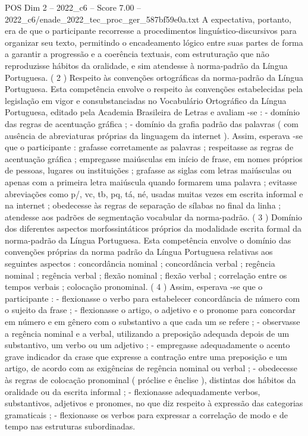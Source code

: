 \begin{textsample}{POS Dim 2 – 2022\_c6 – Score 7.00 – 2022\_c6/enade\_2022\_tec\_proc\_ger\_587bf59e0a.txt}
A expectativa, portanto, era de que o participante recorresse a procedimentos linguístico-discursivos para organizar seu texto, permitindo o encadeamento lógico entre suas partes de forma a garantir a progressão e a coerência textuais, com estruturação que não reproduzisse hábitos da oralidade, e sim atendesse à norma-padrão da Língua Portuguesa. ( 2 ) Respeito às convenções ortográficas da norma-padrão da Língua Portuguesa.
Esta competência envolve o respeito às convenções estabelecidas pela legislação em vigor e consubstanciadas no Vocabulário Ortográfico da Língua Portuguesa, editado pela Academia Brasileira de Letras e avaliam -se : - domínio das regras de acentuação gráfica ; - domínio da grafia padrão das palavras ( com ausência de abreviaturas próprias da linguagem da internet ).
Assim, esperava -se que o participante : grafasse corretamente as palavras ; respeitasse as regras de acentuação gráfica ; empregasse maiúsculas em início de frase, em nomes próprios de pessoas, lugares ou instituições ; grafasse as siglas com letras maiúsculas ou apenas com a primeira letra maiúscula quando formarem uma palavra ; evitasse abreviações como p/, vc, tb, pq, tá, né, usadas muitas vezes em escrita informal e na internet ; obedecesse às regras de separação de sílabas no final da linha ; atendesse aos padrões de segmentação vocabular da norma-padrão. ( 3 ) Domínio dos diferentes aspectos morfossintáticos próprios da modalidade escrita formal da norma-padrão da Língua Portuguesa.
Esta competência envolve o domínio das convenções próprias da norma padrão da Língua Portuguesa relativas aos seguintes aspectos : concordância nominal ; concordância verbal ; regência nominal ; regência verbal ; flexão nominal ; flexão verbal ; correlação entre os tempos verbais ; colocação pronominal. ( 4 ) Assim, esperava -se que o participante : - flexionasse o verbo para estabelecer concordância de número com o sujeito da frase ; - flexionasse o artigo, o adjetivo e o pronome para concordar em número e em gênero com o substantivo a que cada um se refere ; - observasse a regência nominal e a verbal, utilizando a preposição adequada depois de um substantivo, um verbo ou um adjetivo ; - empregasse adequadamente o acento grave indicador da crase que expresse a contração entre uma preposição e um artigo, de acordo com as exigências de regência nominal ou verbal ; - obedecesse às regras de colocação pronominal ( próclise e ênclise ), distintas dos hábitos da oralidade ou da escrita informal ; - flexionasse adequadamente verbos, substantivos, adjetivos e pronomes, no que diz respeito à expressão das categorias gramaticais ; - flexionasse os verbos para expressar a correlação de modo e de tempo nas estruturas subordinadas.

\end{textsample}
